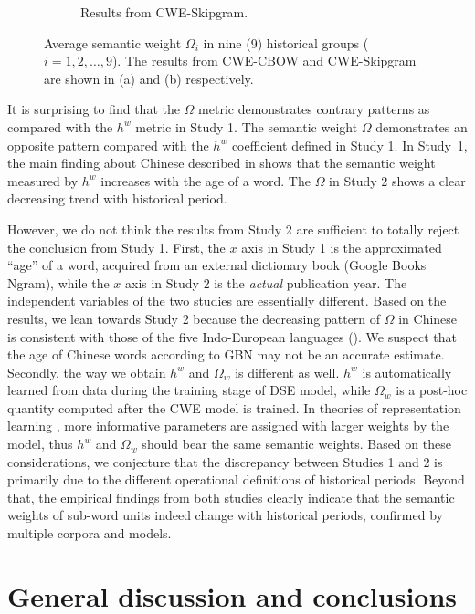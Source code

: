 \documentclass[output=paper]{langsci/langscibook}
\begin{document}
\begin{figure}
\begin{subfigure}{0.65\linewidth}
\label{fig:omega_year_skipgram}
\caption{Results from CWE-Skipgram.}
\end{subfigure}
\caption{Average semantic weight $\Omega_i$ in nine (9) historical groups ($i=1,2,\dots,9$). The results from CWE-CBOW and CWE-Skipgram are shown in (a) and (b) respectively.}\label{fig:omega_year}
\end{figure}


It is surprising to find that the $\Omega$ metric demonstrates contrary patterns as compared with the $h^w$ metric in Study 1. The semantic weight $\Omega$ demonstrates an opposite pattern compared with the $h^w$ coefficient defined in Study 1. 
In Study~1, the main finding about Chinese described in  shows that the semantic weight measured by $h^w$ increases with the age of a word. The $\Omega$ in Study 2 shows a clear decreasing trend with historical period.

However, we do not think the results from Study 2 are sufficient to totally reject the conclusion from Study 1. First, the $x$ axis in Study 1 is the approximated ``age'' of a word, acquired from an external dictionary book (Google Books Ngram), while the $x$ axis in Study 2 is the \emph{actual} publication year. The independent variables of the two studies are essentially different. 
Based on the results, we lean towards Study 2 because the decreasing pattern of $\Omega$ in Chinese is consistent with those of the five Indo-European languages (). We suspect that the age of Chinese words according to GBN may not be an accurate estimate. 
Secondly, the way we obtain $h^w$ and $\Omega_w$ is different as well. $h^w$ is automatically learned from data during the training stage of DSE model, while $\Omega_w$ is a post-hoc quantity computed after the CWE model is trained. In theories of representation learning \citep{bengio2013representation}, more informative parameters are assigned with larger weights by the model, thus $h^w$ and $\Omega_w$ should bear the same semantic weights. 
Based on these considerations, we conjecture that the discrepancy between Studies 1 and 2 is primarily due to the different operational definitions of historical periods. 
Beyond that, the empirical findings from both studies clearly indicate that the semantic weights of sub-word units indeed change with historical periods, confirmed by multiple corpora and models.  


\section{General discussion and conclusions}
\end{document}

